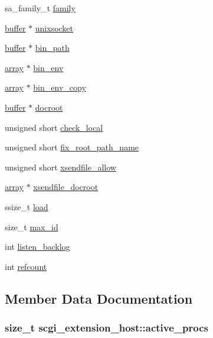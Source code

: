 \begin{DoxyCompactItemize}
sa\-\_\-family\-\_\-t \hyperlink{structscgi__extension__host_affa00a76eaba150648600020e0826cb1}{family}
\item 
\hyperlink{structbuffer}{buffer} $\ast$ \hyperlink{structscgi__extension__host_a530aef6533bec26314ca5c879f2c36a8}{unixsocket}
\item 
\hyperlink{structbuffer}{buffer} $\ast$ \hyperlink{structscgi__extension__host_aed691240580b2f76281de8c24806d868}{bin\-\_\-path}
\item 
\hyperlink{structarray}{array} $\ast$ \hyperlink{structscgi__extension__host_af07506e6cd8a5722109417d0ac7f72c1}{bin\-\_\-env}
\item 
\hyperlink{structarray}{array} $\ast$ \hyperlink{structscgi__extension__host_aefbb04a489c6375bf40c4d758aa28fd8}{bin\-\_\-env\-\_\-copy}
\item 
\hyperlink{structbuffer}{buffer} $\ast$ \hyperlink{structscgi__extension__host_a30ebc957e3a70bcbef54fc6bf66b5105}{docroot}
\item 
unsigned short \hyperlink{structscgi__extension__host_a73c33e5ed6971d2741059c89b9e5af8c}{check\-\_\-local}
\item 
unsigned short \hyperlink{structscgi__extension__host_a3de63dc76af05d78cbf5a18dcc02a8cb}{fix\-\_\-root\-\_\-path\-\_\-name}
\item 
unsigned short \hyperlink{structscgi__extension__host_a2cb7607aadb32562b5818b445e7f5152}{xsendfile\-\_\-allow}
\item 
\hyperlink{structarray}{array} $\ast$ \hyperlink{structscgi__extension__host_a449d1e86de245cbb411ff603193ea679}{xsendfile\-\_\-docroot}
\item 
ssize\-\_\-t \hyperlink{structscgi__extension__host_aae93d0863bca7743a7d8c7409ee901bc}{load}
\item 
size\-\_\-t \hyperlink{structscgi__extension__host_a36bfb6179370a97e083db8e983cd1cc2}{max\-\_\-id}
\item 
int \hyperlink{structscgi__extension__host_ac7e65359015911a546e96bc74813b5be}{listen\-\_\-backlog}
\item 
int \hyperlink{structscgi__extension__host_a718dfa9a434051118c2436755354f0fe}{refcount}
\end{DoxyCompactItemize}


\subsection{Member Data Documentation}
\hypertarget{structscgi__extension__host_af1e0d0b7eb7dd62abea007374c25cac4}{
\subsubsection[{active\-\_\-procs}]{\setlength{\rightskip}{0pt plus 5cm}size\-\_\-t scgi\-\_\-extension\-\_\-host\-::active\-\_\-procs}}\label{structscgi__extension__host_af1e0d0b7eb7dd62abea007374c25cac4}


